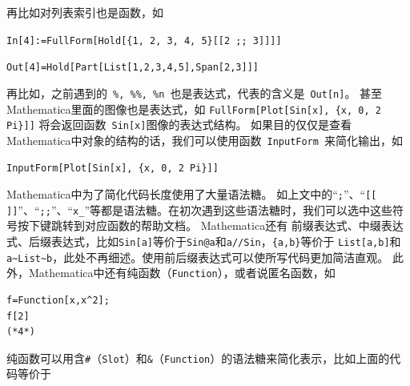 \documentclass[UTF8,a4paper,10pt]{ctexart}
\newcommand{\mma}{Mathematica}
\begin{document}
\noindent
再比如对列表索引也是函数，如

\verb|In[4]:=FullForm[Hold[{1, 2, 3, 4, 5}[[2 ;; 3]]]]|

\verb|Out[4]=Hold[Part[List[1,2,3,4,5],Span[2,3]]]|


\noindent
再比如，之前遇到的~\verb|%, %%, %n|~也是表达式，代表的含义是~\verb|Out[n]|。
甚至\mma 里面的图像也是表达式，如
\verb|FullForm[Plot[Sin[x], {x, 0, 2 Pi}]]|
将会返回函数~\verb|Sin[x]|图像的表达式结构。
如果目的仅仅是查看\mma 中对象的结构的话，我们可以使用函数~\verb|InputForm|~来简化输出，如

\begin{lstlisting}
InputForm[Plot[Sin[x], {x, 0, 2 Pi}]]
\end{lstlisting}


\mma 中为了简化代码长度使用了大量语法糖。
如上文中的“\verb|;|”、“\verb|[[ ]]|”、“\verb|;;|”、“\verb|x_|”等都是语法糖。在初次遇到这些语法糖时，我们可以选中这些符号按下键跳转到对应函数的帮助文档。
Mathematica还有
前缀表达式、中缀表达式、后缀表达式，比如\verb|Sin[a]|等价于\verb|Sin@a|和\verb|a//Sin|，\verb|{a,b}|等价于
\verb|List[a,b]|和\verb|a~List~b|，此处不再细述。使用前后缀表达式可以使所写代码更加简洁直观。
此外，Mathematica中还有纯函数（\verb|Function|），或者说匿名函数，如


\begin{lstlisting}
f=Function[x,x^2];
f[2]
(*4*)
\end{lstlisting}
\noindent
纯函数可以用含\verb|#|（\verb|Slot|）和\verb|&|（\verb|Function|）的语法糖来简化表示，比如上面的代码等价于

\end{document}
